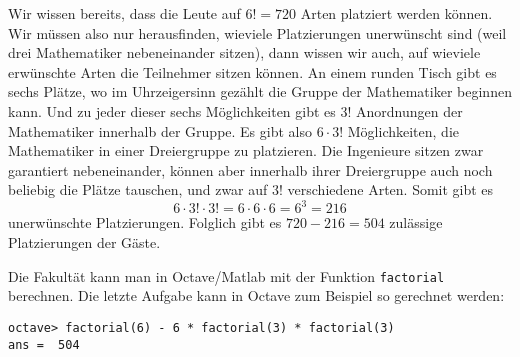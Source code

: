 \begin{beispiele}
\begin{loesung}
\begin{teilaufgaben}
Wir wissen bereits, dass die Leute auf $6!=720$ Arten platziert werden
können.
Wir müssen also nur herausfinden, wieviele Platzierungen
unerwünscht sind (weil drei Mathematiker nebeneinander sitzen),
dann wissen wir auch, auf wieviele erwünschte Arten die Teilnehmer
sitzen können.
An einem runden Tisch gibt es sechs Plätze, wo im Uhrzeigersinn gezählt 
die Gruppe der Mathematiker beginnen kann.
Und zu jeder dieser
sechs Möglichkeiten gibt es $3!$ Anordnungen der Mathematiker innerhalb
der Gruppe.
Es gibt also $6 \cdot 3!$ Möglichkeiten, die Mathematiker
in einer Dreiergruppe zu platzieren.
Die Ingenieure sitzen zwar garantiert nebeneinander, können aber
innerhalb ihrer Dreiergruppe auch noch beliebig die Plätze
tauschen, und zwar auf $3!$ verschiedene Arten.
Somit gibt es
\[
6\cdot 3!\cdot 3!=6\cdot 6\cdot 6=6^3=216
\]
unerwünschte Platzierungen.
Folglich gibt es $720-216=504$ zulässige
Platzierungen der Gäste.
\end{teilaufgaben}
\end{loesung}

\end{beispiele}

Die Fakultät kann man in Octave/Matlab mit der Funktion {\tt factorial}
berechnen.
Die letzte Aufgabe kann in Octave zum Beispiel so gerechnet
werden:
\begin{verbatim}
octave> factorial(6) - 6 * factorial(3) * factorial(3)
ans =  504
\end{verbatim}

